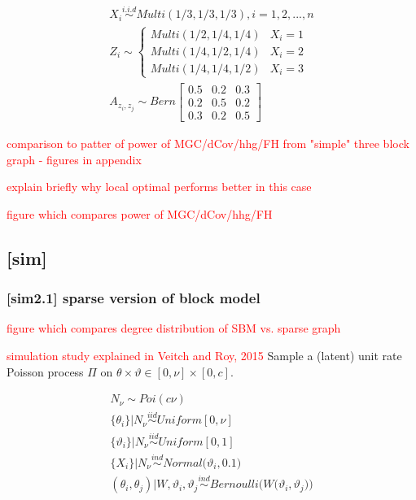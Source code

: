 \documentclass[12pt]{article}
\theoremstyle{definition}
\begin{document}
\begin{equation}
\begin{gathered}
X_{i} \overset{i.i.d}{\sim} Multi(1/3, 1/3, 1/3), i = 1,2, ... , n \\ 
Z_{i}  \sim  \left\{  \begin{array}{ccc} Multi(1/2, 1/4, 1/4) & X_{i} = 1 \\ Multi(1/4, 1/2, 1/4) & X_{i} = 2 \\ Multi(1/4, 1/4, 1/2) & X_{i} = 3  \end{array} \right. \\
A_{z_{i}, z_{j}} \sim Bern \left[  \begin{array}{ccc}   0.5 & 0.2 &  0.3  \\ 0.2 & 0.5 & 0. 2  \\ 0.3 & 0.2 & 0.5  \end{array}  \right]
\end{gathered}
\end{equation}

\textcolor{red}{comparison to patter of power of MGC/dCov/hhg/FH from "simple" three block graph - figures in appendix}


\textcolor{red}{explain briefly why local optimal performs better in this case}


\textcolor{red}{figure which compares power of MGC/dCov/hhg/FH}


\subsection{[sim]}


\subsubsection{[sim2.1] sparse version of block model}



\textcolor{red}{figure which compares degree distribution of SBM vs. sparse graph}



\textcolor{red}{simulation study explained in Veitch and Roy, 2015}
Sample a (latent) unit rate Poisson process $\Pi$ on $\theta \times \vartheta \in [0, \nu] \times [0, c]$.
 
\begin{equation}
\begin{gathered}
N_{\nu} \sim Poi( c \nu) \\ 
\{ \theta_{i} \} \big| N_{\nu} \overset{iid}{\sim} Uniform[0, \nu]  \\ 
\{ \vartheta_{i} \} \big| N_{\nu} \overset{iid}{\sim} Uniform[0,1] \\ 
\{ X_{i}  \} | N_{\nu} \overset{ind}{\sim} Normal \big( \vartheta_{i}, 0.1 \big)  \\ 
(\theta_{i}, \theta_{j}) \big| W, \vartheta_{i}, \vartheta_{j} \overset{ind}{\sim} Bernoulli \big( W\big( \vartheta_{i}, \vartheta_{j} \big) \big) 
\end{gathered}
\end{equation}
\end{document}
